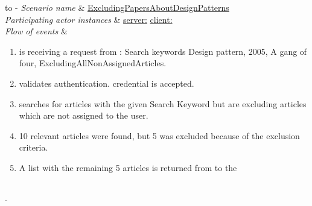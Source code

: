 %
%
\begin{table}[h!]
	\tabulinesep=1.5mm
	\begin{tabu} to 
		\tabucline[1.5pt]-
		\textit{Scenario name} & \underline{ExcludingPapersAboutDesignPatterns} \\
		\hline
		\textit{Participating actor \newline instances} & \underline{server:\serverside}
		\newline \underline{client:\clientside} \\
		\hline
		\textit{Flow of events} &
		\vspace{-3mm}
		\begin{enumerate}[leftmargin=*,topsep=0pt,itemsep=-1ex]
			\item \serverside is receiving a request from \clientside: Search keywords {Design pattern, 2005, A gang of four}, Excluding{AllNonAssignedArticles}.
			
			\item \serverside validates \user authentication. \user credential is accepted.
			
			\item \serverside searches for articles with the given Search Keyword but are excluding articles which are not assigned to the user.
			
			\item 10 relevant articles were found, but 5 was excluded because of the exclusion criteria.
			
			\item A list with the remaining 5 articles is returned from \serverside to the \clientside\\                
		\end{enumerate} \\
		\tabucline[1.5pt]-
	\end{tabu}
	\caption{Scenario when a user wants to exclude some papers.}
	\label{sc:ExcludingPapersAboutDesignPatterns}
\end{table}


